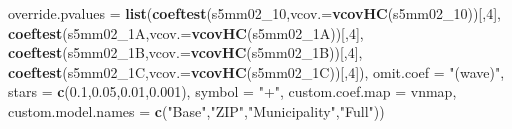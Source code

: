 \documentclass[
]{article}
\newenvironment{Shaded}{\begin{snugshade}}{\end{snugshade}}
\newcommand{\DataTypeTok}[1]{\textcolor[rgb]{0.13,0.29,0.53}{#1}}
\newcommand{\DecValTok}[1]{\textcolor[rgb]{0.00,0.00,0.81}{#1}}
\newcommand{\FloatTok}[1]{\textcolor[rgb]{0.00,0.00,0.81}{#1}}
\newcommand{\KeywordTok}[1]{\textcolor[rgb]{0.13,0.29,0.53}{\textbf{#1}}}
\newcommand{\NormalTok}[1]{#1}
\newcommand{\StringTok}[1]{\textcolor[rgb]{0.31,0.60,0.02}{#1}}
\begin{document}
\begin{Shaded}
\begin{Highlighting}[]
          \DataTypeTok{override.pvalues =} \KeywordTok{list}\NormalTok{(}\KeywordTok{coeftest}\NormalTok{(s5mm02_}\DecValTok{10}\NormalTok{,}\DataTypeTok{vcov.=}\KeywordTok{vcovHC}\NormalTok{(s5mm02_}\DecValTok{10}\NormalTok{))[,}\DecValTok{4}\NormalTok{],}
                                  \KeywordTok{coeftest}\NormalTok{(s5mm02_1A,}\DataTypeTok{vcov.=}\KeywordTok{vcovHC}\NormalTok{(s5mm02_1A))[,}\DecValTok{4}\NormalTok{],}
                                  \KeywordTok{coeftest}\NormalTok{(s5mm02_1B,}\DataTypeTok{vcov.=}\KeywordTok{vcovHC}\NormalTok{(s5mm02_1B))[,}\DecValTok{4}\NormalTok{],}
                                  \KeywordTok{coeftest}\NormalTok{(s5mm02_1C,}\DataTypeTok{vcov.=}\KeywordTok{vcovHC}\NormalTok{(s5mm02_1C))[,}\DecValTok{4}\NormalTok{]),}
          \DataTypeTok{omit.coef =} \StringTok{"(wave)"}\NormalTok{, }\DataTypeTok{stars =} \KeywordTok{c}\NormalTok{(}\FloatTok{0.1}\NormalTok{,}\FloatTok{0.05}\NormalTok{,}\FloatTok{0.01}\NormalTok{,}\FloatTok{0.001}\NormalTok{), }\DataTypeTok{symbol =} \StringTok{"+"}\NormalTok{,}
          \DataTypeTok{custom.coef.map =}\NormalTok{ vnmap, }
          \DataTypeTok{custom.model.names =} \KeywordTok{c}\NormalTok{(}\StringTok{"Base"}\NormalTok{,}\StringTok{"ZIP"}\NormalTok{,}\StringTok{"Municipality"}\NormalTok{,}\StringTok{"Full"}\NormalTok{))}
\end{Highlighting}
\end{Shaded}
\end{document}
